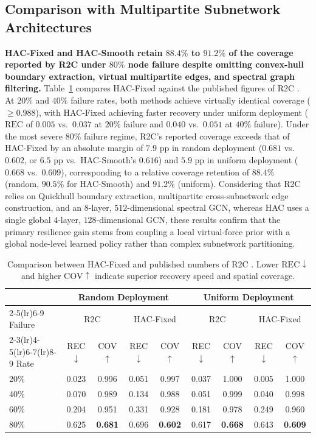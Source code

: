 \documentclass[11pt]{article}
\theoremstyle{plain}
\theoremstyle{definition}
\theoremstyle{remark}
\begin{document}
\subsection{Comparison with Multipartite Subnetwork Architectures}
\label{sec:r2c-comparison}
\textbf{HAC-Fixed and HAC-Smooth retain $88.4\%$ to $91.2\%$ of the coverage reported by R2C under $80\%$ node failure despite omitting convex-hull boundary extraction, virtual multipartite edges, and spectral graph filtering.} Table~\ref{tab:r2c-comparison} compares HAC-Fixed against the published figures of R2C \citep{peng2026r2c}. At $20\%$ and $40\%$ failure rates, both methods achieve virtually identical coverage ($\ge 0.988$), with HAC-Fixed achieving faster recovery under uniform deployment ($\mathrm{REC}$ of $0.005$ vs.\ $0.037$ at $20\%$ failure and $0.040$ vs.\ $0.051$ at $40\%$ failure). Under the most severe $80\%$ failure regime, R2C's reported coverage exceeds that of HAC-Fixed by an absolute margin of $7.9\text{ pp}$ in random deployment ($0.681$ vs.\ $0.602$, or $6.5\text{ pp}$ vs.\ HAC-Smooth's $0.616$) and $5.9\text{ pp}$ in uniform deployment ($0.668$ vs.\ $0.609$), corresponding to a relative coverage retention of $88.4\%$ (random, $90.5\%$ for HAC-Smooth) and $91.2\%$ (uniform). Considering that R2C relies on Quickhull boundary extraction, multipartite cross-subnetwork edge construction, and an $8$-layer, $512$-dimensional spectral GCN, whereas HAC uses a single global $4$-layer, $128$-dimensional GCN, these results confirm that the primary resilience gain stems from coupling a local virtual-force prior with a global node-level learned policy rather than complex subnetwork partitioning.

\begin{table}[t]
\centering
\caption{Comparison between HAC-Fixed and published numbers of R2C \citep{peng2026r2c}. Lower $\mathrm{REC}\downarrow$ and higher $\mathrm{COV}\uparrow$ indicate superior recovery speed and spatial coverage.}
\label{tab:r2c-comparison}
\small
\begin{tabular}{@{}lcccccccc@{}}
\toprule
 & \multicolumn{4}{c}{Random Deployment} & \multicolumn{4}{c}{Uniform Deployment} \\
\cmidrule(lr){2-5}\cmidrule(lr){6-9}
Failure & \multicolumn{2}{c}{R2C \citep{peng2026r2c}} & \multicolumn{2}{c}{HAC-Fixed} & \multicolumn{2}{c}{R2C \citep{peng2026r2c}} & \multicolumn{2}{c}{HAC-Fixed} \\
\cmidrule(lr){2-3}\cmidrule(lr){4-5}\cmidrule(lr){6-7}\cmidrule(lr){8-9}
Rate & REC$\downarrow$ & COV$\uparrow$ & REC$\downarrow$ & COV$\uparrow$ & REC$\downarrow$ & COV$\uparrow$ & REC$\downarrow$ & COV$\uparrow$ \\
\midrule
20\% & 0.023 & 0.996 & 0.051 & 0.997 & 0.037 & 1.000 & 0.005 & 1.000 \\
40\% & 0.070 & 0.989 & 0.134 & 0.988 & 0.051 & 0.999 & 0.040 & 0.998 \\
60\% & 0.204 & 0.951 & 0.331 & 0.928 & 0.181 & 0.978 & 0.249 & 0.960 \\
80\% & 0.625 & \textbf{0.681} & 0.696 & \textbf{0.602} & 0.617 & \textbf{0.668} & 0.643 & \textbf{0.609} \\
\bottomrule
\end{tabular}
\end{table}
\end{document}
